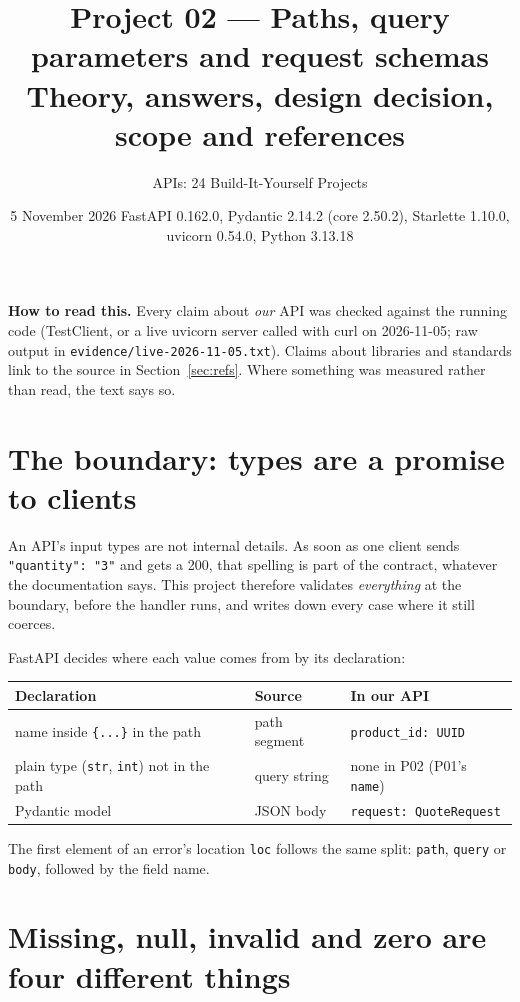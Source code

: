 \documentclass[11pt,a4paper]{article}
\title{\textbf{Project 02 --- Paths, query parameters and request schemas}\\[0.3em]\large Theory, answers, design decision, scope and references}
\author{APIs: 24 Build-It-Yourself Projects}
\date{5 November 2026 \quad\textbullet\quad FastAPI 0.162.0, Pydantic 2.14.2 (core 2.50.2), Starlette 1.10.0, uvicorn 0.54.0, Python 3.13.18}
\newcommand{\code}[1]{\texttt{#1}}
\newcommand{\keypoint}[1]{%
  \par\smallskip\noindent\colorbox{boxbg}{\parbox{\dimexpr\linewidth-2\fboxsep}{\small #1}}\par\smallskip}
\begin{document}
\maketitle

\keypoint{\textbf{How to read this.} Every claim about \emph{our} API was checked
against the running code (TestClient, or a live uvicorn server called with curl on
2026-11-05; raw output in \code{evidence/live-2026-11-05.txt}). Claims about
libraries and standards link to the source in Section~\ref{sec:refs}. Where
something was measured rather than read, the text says so.}

\setcounter{tocdepth}{1}
\tableofcontents

\section{The boundary: types are a promise to clients}

An API's input types are not internal details. As soon as one client sends
\code{"quantity": "3"} and gets a 200, that spelling is part of the contract,
whatever the documentation says. This project therefore validates \emph{everything}
at the boundary, before the handler runs, and writes down every case where it still
coerces.

FastAPI decides where each value comes from by its declaration:

\begin{tabularx}{\linewidth}{@{}l L L@{}}
\toprule
\textbf{Declaration} & \textbf{Source} & \textbf{In our API} \\
\midrule
name inside \code{\{...\}} in the path & path segment & \code{product\_id: UUID} \\
plain type (\code{str}, \code{int}) not in the path & query string & none in P02 (P01's \code{name}) \\
Pydantic model & JSON body & \code{request: QuoteRequest} \\
\bottomrule
\end{tabularx}

The first element of an error's location \code{loc} follows the same split:
\code{path}, \code{query} or \code{body}, followed by the field name.

\section{Missing, null, invalid and zero are four different things}
\end{document}
